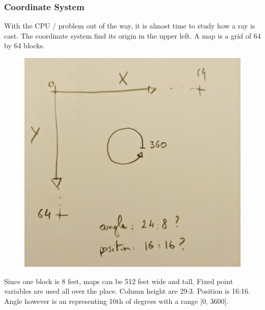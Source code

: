 \subsubsection{Coordinate System}
With the CPU / problem out of the way, it is almost time to study how a ray is cast. The coordinate system find its origin in the upper left. A map is a grid of 64 by 64 blocks. 
\begin{figure}[H]
  \centering
 \includegraphics[width=.5\textwidth]{imgs/drawings/coordinate_system.png}
\end{figure}
\par
Since one block is 8 feet, maps can be 512 feet wide and tall. Fixed point variables are used all over the place. Column height are 29:3. Position is 16:16. Angle however is an  representing 10th of degrees with a range [0, 3600].

















